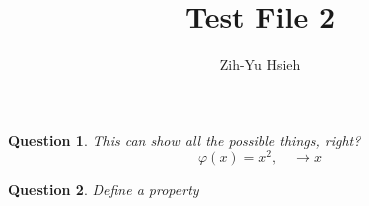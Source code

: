 \documentclass{article}
\title{Test File 2}
\author{Zih-Yu Hsieh}
\newtheorem{question}{Question}
\begin{document}
\maketitle

\begin{question}
    This can show all the possible things, right? 
    $$\varphi(x) = x^2,\quad \rightarrow x$$
\end{question}

\begin{question}
    Define a property
\end{question}
\end{document}
